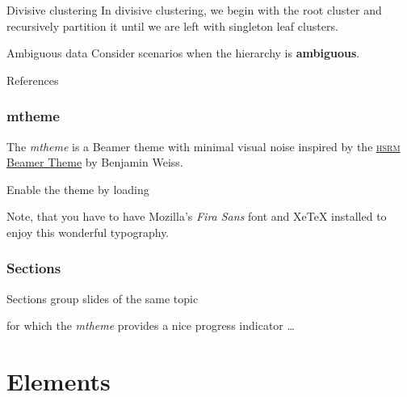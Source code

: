 \documentclass[10pt, compress]{beamer}
\begin{document}
\begin{frame}{Divisive clustering}
  In divisive clustering, we begin with the root cluster
  and recursively partition it until we are left with
  singleton leaf clusters.
\end{frame}

\begin{frame}{Ambiguous data}
  Consider scenarios when the hierarchy is
  \textbf{ambiguous}.
\end{frame}

\begin{frame}{References}
  
\end{frame}

\begin{frame}[fragile]
  \frametitle{mtheme}

  The \emph{mtheme} is a Beamer theme with minimal visual noise inspired by the
  \href{https://github.com/hsrmbeamertheme/hsrmbeamertheme}{\textsc{hsrm} Beamer
  Theme} by Benjamin Weiss.

  Enable the theme by loading


  Note, that you have to have Mozilla's \emph{Fira Sans} font and XeTeX
  installed to enjoy this wonderful typography.
\end{frame}

\begin{frame}[fragile]
  \frametitle{Sections}
  Sections group slides of the same topic


  for which the \emph{mtheme} provides a nice progress indicator \ldots
\end{frame}

\section{Elements}
\end{document}
